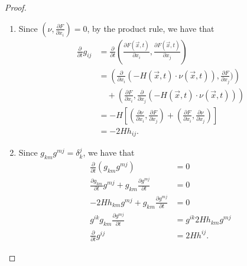 \begin{proof}\leavevmode
	\begin{enumerate}[\normalfont(1)]
		\item Since $\left( \nu ,\frac{\partial F}{\partial x_{i}}  \right) =0$, by the product rule, we have that
		      \begin{equation*}
			      \begin{split}
				      \frac{\partial }{\partial t} g_{ij}^{}
				      & = \frac{\partial }{\partial t} \left( \frac{\partial F(\vec{x},t) }{\partial x_{i}} , \frac{\partial F(\vec{x},t) }{\partial x_{j }}  \right)                                                                                                               \\
				      & = \left( \frac{\partial }{\partial x_{i}} (-H (\vec{x},t) \cdot \nu (\vec{x},t)) , \frac{\partial F}{\partial x_{j}} ) \right) \\
					  & \quad + \left( \frac{\partial F}{\partial x_{i}}, \frac{\partial }{\partial x_{j}} (-H (\vec{x},t) \cdot \nu (\vec{x},t))  \right) \\
				      & = -H \left[ \left( \frac{\partial \nu }{\partial x_{i}} , \frac{\partial F}{\partial x_{j}}  \right) + \left( \frac{\partial F}{\partial x_{i}} , \frac{\partial \nu }{\partial x_{j}}  \right) \right]                                                                    \\
				      & = -2H h_{ij}^{}.
			      \end{split}
		      \end{equation*}
		\item Since $g_{km}^{} g_{}^{mj} = \delta_{k}^{j} $, we have that
		      \begin{align*}
			      \frac{\partial }{\partial t} (g_{km}^{} g_{}^{mj})                                                  & =0                                \\
			      \frac{\partial g_{km}^{} }{\partial t} g_{}^{mj} + g_{km}^{} \frac{\partial g_{}^{mj} }{\partial t} & =0                                \\
			      -2H h_{km}^{} g_{}^{mj} + g_{km}^{} \frac{\partial g_{}^{mj} }{\partial t}                          & =0                                \\
			      g_{}^{ik} g_{km}^{} \frac{\partial g_{}^{mj} }{\partial t}                                          & =g_{}^{ik} 2H h_{km}^{} g_{}^{mj} \\
			      \frac{\partial }{\partial t} g_{}^{ij}                                                              & = 2H h_{}^{ij}.

\end{align*}
\end{enumerate}
\end{proof}
